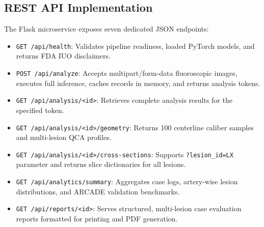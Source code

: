\subsection{REST API Implementation}
The Flask microservice exposes seven dedicated JSON endpoints:
\begin{itemize}
    \item \texttt{GET /api/health}: Validates pipeline readiness, loaded PyTorch models, and returns FDA IUO disclaimers.
    \item \texttt{POST /api/analyze}: Accepts multipart/form-data fluoroscopic images, executes full inference, caches records in memory, and returns analysis tokens.
    \item \texttt{GET /api/analysis/<id>}: Retrieves complete analysis results for the specified token.
    \item \texttt{GET /api/analysis/<id>/geometry}: Returns 100 centerline caliber samples and multi-lesion QCA profiles.
    \item \texttt{GET /api/analysis/<id>/cross-sections}: Supports \texttt{?lesion\_id=LX} parameter and returns slice dictionaries for all lesions.
    \item \texttt{GET /api/analytics/summary}: Aggregates case logs, artery-wise lesion distributions, and ARCADE validation benchmarks.
    \item \texttt{GET /api/reports/<id>}: Serves structured, multi-lesion case evaluation reports formatted for printing and PDF generation.
\end{itemize}

